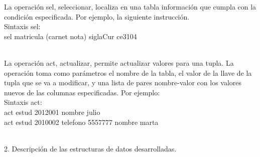 \documentclass[12pt,a4paper]{report}
\begin{document}
\begin{flushleft}
La operación sel, seleccionar, localiza en una tabla información que cumpla con la condición especificada. Por ejemplo, la siguiente instrucción.\\
Sintaxis sel:\\
sel matricula (carnet nota) siglaCur ce3104\\\

La operación act, actualizar, permite actualizar valores para una tupla. La operación toma como parámetros el nombre de la tabla, el valor de la 
llave de la tupla que se va a modificar, y una lista de pares nombre-valor con los valores nuevos de las columnas especificadas. Por ejemplo:\\
Sintaxis act:\\
act estud 2012001 nombre julio \\
act estud 2010002 telefono 5557777 nombre marta\\\


\end{flushleft}

\begin{flushleft}

2. Descripción de las estructuras de datos desarrolladas.

\end{flushleft}
\end{document}
